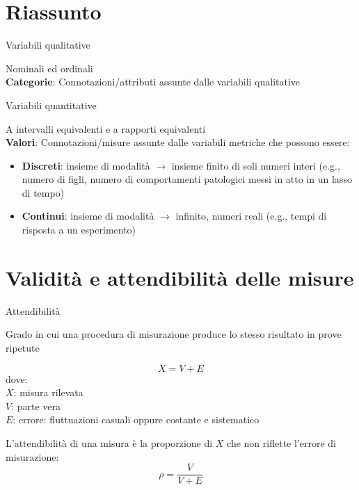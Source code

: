 \documentclass[compress]{beamer}
\begin{document}
\section*{Riassunto}

\begin{frame}
	\begin{block}{Variabili qualitative}
		
		Nominali ed ordinali\\
		\textbf{Categorie}: Connotazioni/attributi assunte dalle variabili qualitative
	\end{block}
	
	\begin{block}{Variabili quantitative}
		
		A intervalli equivalenti e a rapporti equivalenti\\
		\textbf{Valori}: Connotazioni/misure assunte dalle variabili metriche che possono essere: 
		\begin{itemize}
		\item \textbf{Discreti}: insieme di modalità $\rightarrow$ insieme finito di soli numeri interi (e.g., numero di figli, numero di comportamenti patologici messi in atto in un lasso di tempo)
	
	\item \textbf{Continui}:  insieme di modalità $\rightarrow$ infinito, numeri reali (e.g., tempi di risposta a un esperimento)
		\end{itemize}
	\end{block}
\end{frame}


\section[Validità]{Validità e attendibilità delle misure}

\begin{frame}{Attendibilità}
	
	Grado in cui una procedura di misurazione produce lo stesso risultato in prove ripetute
	
	\begin{equation*}
		X = V + E
	\end{equation*}
	dove: \\
	$X$: misura rilevata\\
	$V$: parte vera\\
	$E$: errore: fluttuazioni casuali oppure costante e sistematico
	
	\pause
	L'attendibilità di una misura è la proporzione di $X$ che non riflette l'errore di misurazione: 
	\begin{equation*}
		\rho = \dfrac{V}{V + E}
	\end{equation*}
	
\end{frame}
\end{document}
